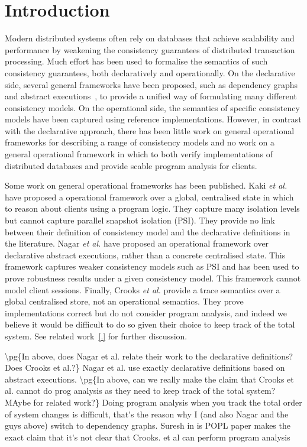 \section{Introduction}

Modern distributed systems often rely on databases that achieve
scalability and performance by weakening the consistency guarantees of
distributed transaction processing.  Much effort has been used to
formalise the semantics of such consistency guarantees, both
declaratively and operationally.  On the declarative side, several
general frameworks have been proposed, such as dependency
graphs~\cite{.} and abstract executions~\cite{.}, to provide a unified
way of formulating many different consistency models.  On the
operational side, the semantics of  specific consistency models have
been captured using reference implementations. However, in contrast
with the declarative approach, there has been
little work on general operational frameworks for describing a range
of consistency models and no work on a general operational framework
in which to both verify implementations of distributed databases and 
provide scable program analysis for clients.

Some work on general operational frameworks has been published. Kaki
{\em et al.}\cite{.} have proposed a operational framework over a
global, centralised state in which to reason about clients using a
program logic. They capture many isolation levels but cannot capture
parallel snapshot isolation (PSI). They provide no link between their
definition of consistency model and the declarative definitions in the
literature. Nagar {\em et al.}\cite{.} have proposed an operational
framework over declarative abstract executions, rather than a concrete
centralised state. This framework captures weaker consistency models
such as PSI and has been used to prove robustness results under a
given consistency model.  This framework cannot model client sessions.
Finally, Crooks {\em et al.} provide a trace semantics over a global
centralised store, not an operational semantics. They prove 
implementations correct but  do not consider program analysis, and
indeed we believe it would be difficult to do so given their choice to
keep track of the total system.
See related work~\ref{.} for further discussion. 




\ac{
\pg{In above, does Nagar et al.  relate their work to the declarative
  definitions?
Does Crooks et al.?}
Nagar et al. use exactly declarative definitions based on abstract executions.
}
\ac{
\pg{In above, can we really make the claim that Crooks et al. cannot
  do prog analysis as  they need to keep track of the total system?
  MAybe for related work?}
Doing program analysis when you track the total order of system changes 
is difficult, that's the reason why I (and also Nagar and the guys above) switch 
to dependency graphs. Suresh in is POPL paper makes the exact claim that 
it's not clear that Crooks. et al can perform program analysis 
}


